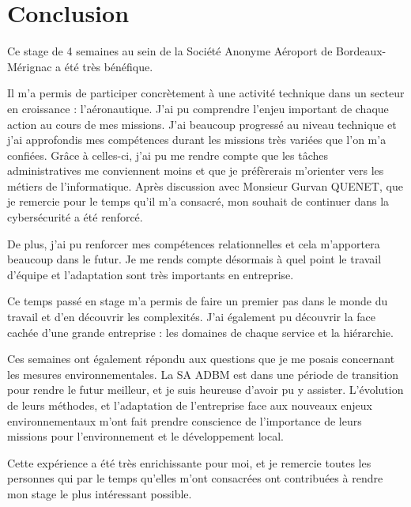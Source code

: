 \chapter{Conclusion}

Ce stage de 4 semaines au sein de la Société Anonyme Aéroport de Bordeaux-Mérignac a été très bénéfique.\newline

Il m'a permis de participer concrètement à une activité technique dans un secteur en croissance : l'aéronautique. J'ai pu comprendre l'enjeu important de chaque action au cours de mes missions. J'ai beaucoup progressé au niveau technique et j'ai approfondis mes compétences durant les missions très variées que l'on m'a confiées. Grâce à celles-ci, j'ai pu me rendre compte que les tâches administratives me conviennent moins et que je préfèrerais m'orienter vers les métiers de l'informatique. Après discussion avec Monsieur Gurvan QUENET, que je remercie pour le temps qu'il m'a consacré, mon souhait de continuer dans la cybersécurité a été renforcé.

De plus, j'ai pu renforcer mes compétences relationnelles et cela m'apportera beaucoup dans le futur. Je me rends compte désormais à quel point le travail d'équipe et l'adaptation sont très importants en entreprise.

Ce temps passé en stage m’a permis de faire un premier pas dans le monde du travail et d’en découvrir les complexités. J’ai également pu découvrir la face cachée d’une grande entreprise : les domaines de chaque service et la hiérarchie.

Ces semaines ont également répondu aux questions que je me posais concernant les mesures environnementales. La SA ADBM est dans une période de transition pour rendre le futur meilleur, et je suis heureuse d'avoir pu y assister. L'évolution de leurs méthodes, et l'adaptation de l'entreprise face aux nouveaux enjeux environnementaux m'ont fait prendre conscience de l'importance de leurs missions pour l'environnement et le développement local.\newline

Cette expérience a été très enrichissante pour moi, et je remercie toutes les personnes qui par le temps qu'elles m'ont consacrées ont contribuées à rendre mon stage le plus intéressant possible.